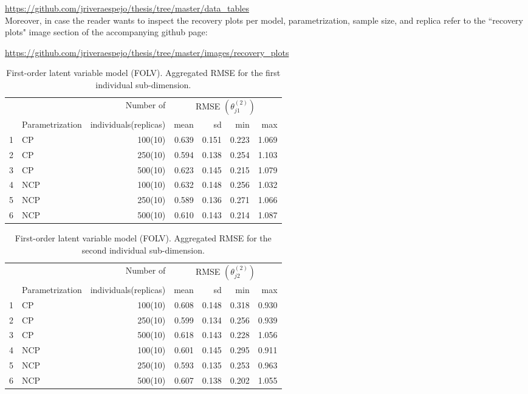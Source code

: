 \noindent \url{https://github.com/jriveraespejo/thesis/tree/master/data_tables} \\

Moreover, in case the reader wants to inspect the recovery plots per model, parametrization, sample size, and replica refer to the ``recovery plots" image section of the accompanying github page:

\noindent \url{https://github.com/jriveraespejo/thesis/tree/master/images/recovery_plots} \\
%
\begin{table}[H]
	\centering
	\begin{tabular}{rlrrrrr}
		\hline
		\multicolumn{2}{c}{ } & Number of & \multicolumn{4}{c}{ RMSE $( \theta^{(2)}_{j1} )$ } \\ 
		\cmidrule(rl){4-7}
		& Parametrization & individuals(replicas) & mean & sd & min & max \\  
		\hline\hline
		1 & CP &  100(10) & 0.639 & 0.151 & 0.223 & 1.069 \\ 
		2 & CP &  250(10) & 0.594 & 0.138 & 0.254 & 1.103 \\ 
		3 & CP &  500(10) & 0.623 & 0.145 & 0.215 & 1.079 \\ 
		\hline
		4 & NCP &  100(10) & 0.632 & 0.148 & 0.256 & 1.032 \\  
		5 & NCP &  250(10) & 0.589 & 0.136 & 0.271 & 1.066 \\ 
		6 & NCP &  500(10) & 0.610 & 0.143 & 0.214 & 1.087 \\  
		\hline
	\end{tabular}
	\caption[First-order latent variable model (FOLV). Aggregated RMSE for the first individual sub-dimension.]%
	{First-order latent variable model (FOLV). Aggregated RMSE for the first individual sub-dimension.}
	\label{tab:FOLV_RMSE_theta1}
\end{table}
%
\begin{table}[H]
	\centering
	\begin{tabular}{rlrrrrr}
		\hline
		\multicolumn{2}{c}{ } & Number of & \multicolumn{4}{c}{ RMSE $( \theta^{(2)}_{j2} )$} \\ 
		\cmidrule(rl){4-7}
		& Parametrization & individuals(replicas) & mean & sd & min & max \\  
		\hline\hline
		1 & CP &  100(10) & 0.608 & 0.148 & 0.318 & 0.930 \\ 
		2 & CP &  250(10) & 0.599 & 0.134 & 0.256 & 0.939 \\  
		3 & CP &  500(10) & 0.618 & 0.143 & 0.228 & 1.056 \\  
		\hline
		4 & NCP &  100(10) & 0.601 & 0.145 & 0.295 & 0.911 \\ 
		5 & NCP &  250(10) & 0.593 & 0.135 & 0.253 & 0.963 \\ 
		6 & NCP &  500(10) & 0.607 & 0.138 & 0.202 & 1.055 \\
		\hline
	\end{tabular}
	\caption[First-order latent variable model (FOLV). Aggregated RMSE for the second individual sub-dimension.]%
	{First-order latent variable model (FOLV). Aggregated RMSE for the second individual sub-dimension.}
	\label{tab:FOLV_RMSE_theta2}
\end{table}
